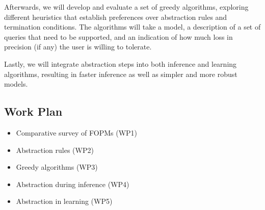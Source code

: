 \documentclass[11pt,english,twocolumn]{article}
\begin{document}
Afterwards, we will develop and evaluate a set of greedy algorithms, exploring
different heuristics that establish preferences over abstraction rules and
termination conditions. The algorithms will take a model, a description of a set
of queries that need to be supported, and an indication of how much loss in
precision (if any) the user is willing to tolerate.

Lastly, we will integrate abstraction steps into both inference and learning
algorithms, resulting in faster inference as well as simpler and more robust
models.


\subsection{Work Plan}

\begin{itemize}
\item Comparative survey of FOPMs (WP1)
\item Abstraction rules (WP2)
\item Greedy algorithms (WP3)
\item Abstraction during inference (WP4)
\item Abstraction in learning (WP5)
\end{itemize}
\end{document}
